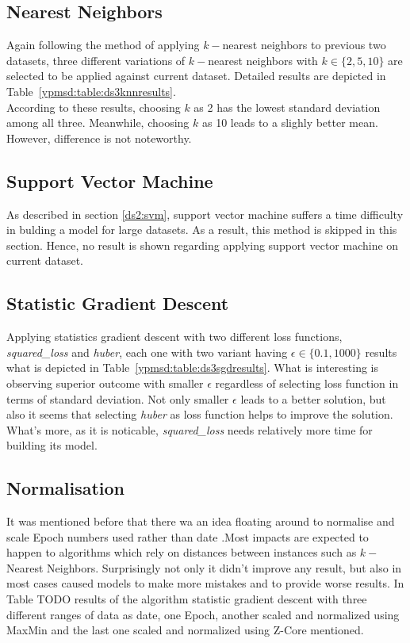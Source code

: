 \subsection{Nearest Neighbors}

Again following the method of applying $k-$nearest neighbors to previous two
datasets, three different variations of $k-$nearest neighbors with
$k\in\{2, 5, 10\}$ are selected to be applied against current dataset. Detailed
results are depicted in Table~\ref{ypmsd:table:ds3knnresults}.\\
According to these results, choosing $k$ as 2 has the lowest standard deviation
among all three. Meanwhile, choosing $k$ as 10 leads to a slighly better mean.
However, difference is not noteworthy.


\subsection{Support Vector Machine}

As described in section \ref{ds2:svm}, support vector machine suffers a time
difficulty in bulding a model for large datasets. As a result, this method is skipped in
this section. Hence, no result is shown regarding applying support vector
machine on current dataset.

\subsection{Statistic Gradient Descent}

Applying statistics gradient descent with two different loss functions, {\it
squared\_loss} and {\it huber}, each one with two variant having $\epsilon \in
\{0.1, 1000\}$ results what is depicted in
Table~\ref{ypmsd:table:ds3sgdresults}. What is interesting is observing superior
outcome with smaller $\epsilon$ regardless of selecting loss function in terms
of standard deviation. Not only smaller $\epsilon$ leads to a better solution,
but also it seems that selecting {\it huber} as loss function helps to improve
the solution.
What's more, as it is noticable, {\it squared\_loss} needs relatively more time
for building its model.

\subsection{Normalisation}
It was mentioned before that there wa an idea floating around to normalise
and scale Epoch numbers used rather than date .Most impacts are
expected to happen to algorithms which rely on distances between instances such
as $k-$Nearest Neighbors. Surprisingly not only it didn't
improve any result, but also in most cases caused models to make more mistakes
and to provide worse results. In Table TODO results of the algorithm
statistic gradient descent with three different ranges of data as date, one Epoch, another
scaled and normalized using MaxMin and the last one scaled and normalized using
Z-Core mentioned.


